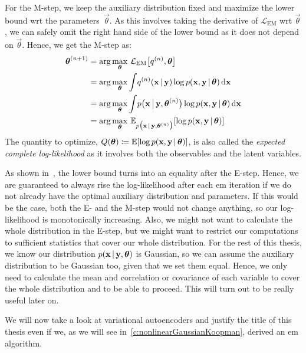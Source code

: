 	For the M-step, we keep the auxiliary distribution fixed and maximize the lower bound \ac{wrt} the parameters~\(\vec{\theta}\). As this involves taking the derivative of \(\mathcal{L}_\mathrm{EM}\) \ac{wrt} \(\vec{\theta}\), we can safely omit the right hand side of the lower bound as it does not depend on \(\vec{\theta}\). Hence, we get the M-step as:
	\begin{align*}
		\boldsymbol{\mathrm{\theta}}^{(n + 1)}
			&= \arg\max_{\boldsymbol{\mathrm{\theta}}}\, \mathcal{L}_\mathrm{EM}\big[ q^{(n)}, \boldsymbol{\mathrm{\theta}} \big] \\
			&= \arg\max_{\boldsymbol{\mathrm{\theta}}} \int\! q^{(n)}(\boldsymbol{\mathrm{x}} \,\vert\, \boldsymbol{\mathrm{y}}) \log p(\boldsymbol{\mathrm{x}}, \boldsymbol{\mathrm{y}} \,\vert\, \boldsymbol{\mathrm{\theta}}) \dd{\boldsymbol{\mathrm{x}}} \\
			&= \arg\max_{\boldsymbol{\mathrm{\theta}}} \int\! p\big(\boldsymbol{\mathrm{x}} \,\big\vert\, \boldsymbol{\mathrm{y}}, \boldsymbol{\mathrm{\theta}}^{(n)}\big) \log p(\boldsymbol{\mathrm{x}}, \boldsymbol{\mathrm{y}} \,\vert\, \boldsymbol{\mathrm{\theta}}) \dd{\boldsymbol{\mathrm{x}}} \\
			&= \arg\max_{\boldsymbol{\mathrm{\theta}}}\, \mathbb{E}_{p\big(\boldsymbol{\mathrm{x}} \,\vert\, \boldsymbol{\mathrm{y}}, \boldsymbol{\mathrm{\theta}}^{(n)}\big)}[\log p(\boldsymbol{\mathrm{x}}, \boldsymbol{\mathrm{y}} \,\vert\, \boldsymbol{\mathrm{\theta}})]
	\end{align*}
	The quantity to optimize, \( Q(\boldsymbol{\mathrm{\theta}}) \coloneqq \mathbb{E}[\log p(\boldsymbol{\mathrm{x}}, \boldsymbol{\mathrm{y}} \,\vert\, \boldsymbol{\mathrm{\theta}})] \), is also called the \emph{expected complete log-likelihood} as it involves both the observables and the latent variables.

	As shown in~\cite{bealVariationalAlgorithmsApproximate2003a}, the lower bound turns into an equality after the E-step. Hence, we are guaranteed to always rise the log-likelihood after each \ac{em} iteration if we do not already have the optimal auxiliary distribution and parameters. If this would be the case, both the E- and the M-step would not change anything, so our log-likelihood is monotonically increasing. Also, we might not want to calculate the whole distribution in the E-step, but we might want to restrict our computations to sufficient statistics that cover our whole distribution. For the rest of this thesis, we know our distribution \( p(\boldsymbol{\mathrm{x}} \,\vert\, \boldsymbol{\mathrm{y}}, \boldsymbol{\mathrm{\theta}}) \) is Gaussian, so we can assume the auxiliary distribution to be Gaussian too, given that we set them equal. Hence, we only need to calculate the mean and correlation or covariance of each variable to cover the whole distribution and to be able to proceed. This will turn out to be really useful later on.

	We will now take a look at variational autoencoders and justify the title of this thesis even if we, as we will see in~\autoref{c:nonlinearGaussianKoopman}, derived an \ac{em} algorithm.

